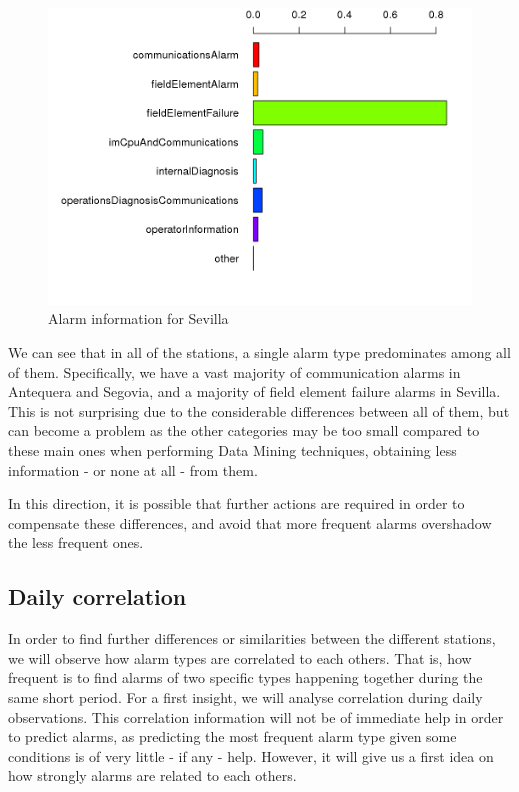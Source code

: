 \documentclass[a4paper,12pt]{article}
\begin{document}
\begin{figure}[htb]
 \centering
 \includegraphics[width=\textwidth]{./img/sevilla_graph.png}
 \caption{Alarm information for Sevilla}
 \label{fig:sevilla_chart}
\end{figure}

\clearpage

We can see that in all of the stations, a single alarm type predominates among all of them. Specifically, we have a vast majority of communication alarms in Antequera and Segovia, and a majority of field element failure alarms in Sevilla. This is not surprising due to the considerable differences between all of them, but can become a problem as the other categories may be too small compared to these main ones when performing Data Mining techniques, obtaining less information - or none at all - from them.

In this direction, it is possible that further actions are required in order to compensate these differences, and avoid that more frequent alarms overshadow the less frequent ones.

\subsection{Daily correlation}
In order to find further differences or similarities between the different stations, we will observe how alarm types are correlated to each others\cite{edwards1976introduction}. That is, how frequent is to find alarms of two specific types happening together during the same short period. For a first insight, we will analyse correlation during daily observations. This correlation information will not be of immediate help in order to predict alarms, as predicting the most frequent alarm type given some conditions is of very little - if any - help. However, it will give us a first idea on how strongly alarms are related to each others.
\end{document}
